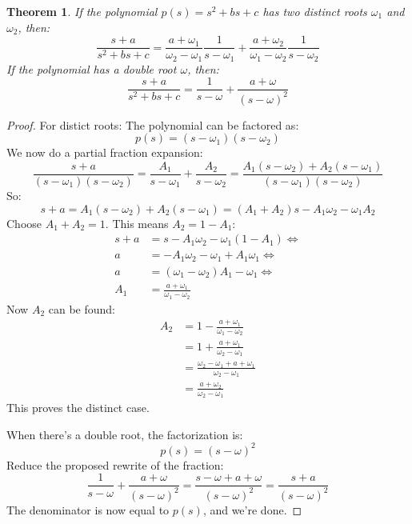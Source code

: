 \documentclass[12pt, a4paper]{article}
\newtheorem{theorem}{Theorem}[section]
\numberwithin{equation}{section}
\begin{document}
\begin{theorem}
\label{rewrite_error_theorem}
If the polynomial $p(s)=s^2+bs+c$ has two distinct roots $\omega_1$ and $\omega_2$, then:
\begin{equation}
\frac{s+a}{s^2+bs+c}=\frac{a+\omega_1}{\omega_2-\omega_1}\frac{1}{s-\omega_1}+\frac{a+\omega_2}{\omega_1-\omega_2}\frac{1}{s-\omega_2}
\end{equation}
If the polynomial has a double root $\omega$, then:
\begin{equation}
\frac{s+a}{s^2+bs+c}=\frac{1}{s-\omega}+\frac{a+\omega}{(s-\omega)^2}
\end{equation}
\end{theorem}

\begin{proof}
For distict roots: The polynomial can be factored as:
\begin{equation}
p(s)=(s-\omega_1)(s-\omega_2)
\end{equation}
We now do a partial fraction expansion:
\begin{equation}
\frac{s+a}{(s-\omega_1)(s-\omega_2)}=\frac{A_1}{s-\omega_1}+\frac{A_2}{s-\omega_2}=\frac{A_1(s-\omega_2)+A_2(s-\omega_1)}{(s-\omega_1)(s-\omega_2)}
\end{equation}
So:
\begin{equation}
s+a=A_1(s-\omega_2)+A_2(s-\omega_1)=(A_1+A_2)s-A_1\omega_2-\omega_1 A_2
\end{equation}
Choose $A_1+A_2=1$. This means $A_2=1-A_1$:
\begin{align}
s+a&=s-A_1\omega_2-\omega_1(1-A_1)\Leftrightarrow\\
a&=-A_1\omega_2-\omega_1+A_1\omega_1\Leftrightarrow\\
a&=(\omega_1-\omega_2)A_1-\omega_1\Leftrightarrow\\
A_1&=\frac{a+\omega_1}{\omega_1-\omega_2}
\end{align}
Now $A_2$ can be found:
\begin{align}
A_2&=1-\frac{a+\omega_1}{\omega_1-\omega_2}\\
&=1+\frac{a+\omega_1}{\omega_2-\omega_1}\\
&=\frac{\omega_2-\omega_1+a+\omega_1}{\omega_2-\omega_1}\\
&=\frac{a+\omega_2}{\omega_2-\omega_1}
\end{align}
This proves the distinct case.

When there's a double root, the factorization is:
\begin{equation}
p(s)=(s-\omega)^2
\end{equation}
Reduce the proposed rewrite of the fraction:
\begin{equation}
\frac{1}{s-\omega}+\frac{a+\omega}{(s-\omega)^2}=\frac{s-\omega+a+\omega}{(s-\omega)^2}=\frac{s+a}{(s-\omega)^2}
\end{equation}
The denominator is now equal to $p(s)$, and we're done.
\end{proof}
\end{document}
